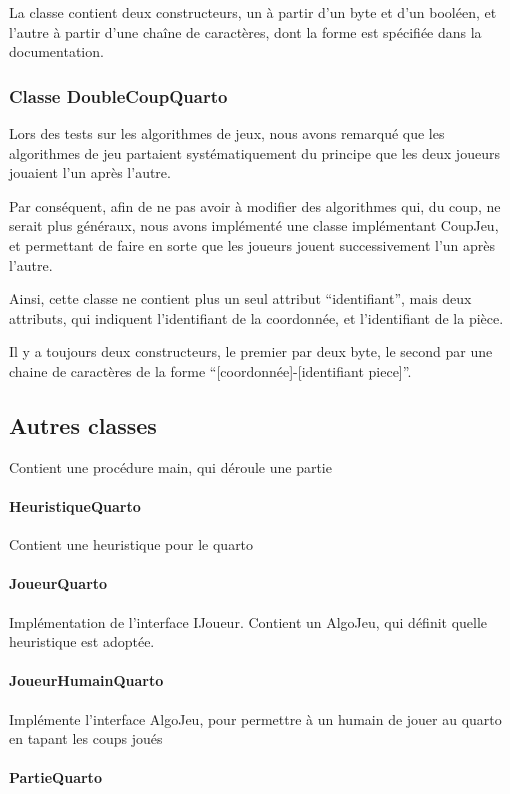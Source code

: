 \documentclass{article}
\begin{document}
La classe contient deux constructeurs, un à partir d'un byte et d'un
booléen, et l'autre à partir d'une chaîne de caractères, dont la forme
est spécifiée dans la documentation. %


\subsubsection{Classe DoubleCoupQuarto}
Lors des tests sur les algorithmes de jeux, nous avons remarqué que
les algorithmes de jeu partaient systématiquement du principe que les
deux joueurs jouaient l'un après l'autre.

Par conséquent, afin de ne pas avoir à modifier des algorithmes qui,
du coup, ne serait plus généraux, nous avons implémenté une classe
implémentant CoupJeu, et permettant de faire en sorte que les joueurs
jouent successivement l'un après l'autre.

Ainsi, cette classe ne contient plus un seul attribut ``identifiant'',
mais deux attributs, qui indiquent l'identifiant de la coordonnée,
et l'identifiant de la pièce.

Il y a toujours deux constructeurs, le premier par deux byte, le
second par une chaine de caractères de la forme
``[coordonnée]-[identifiant piece]''.

\subsection{Autres classes}
Contient une procédure main, qui déroule une partie

\paragraph{HeuristiqueQuarto}
Contient une heuristique pour le quarto

\paragraph{JoueurQuarto}
Implémentation de l'interface IJoueur. Contient un AlgoJeu, qui
définit quelle heuristique est adoptée.


\paragraph{JoueurHumainQuarto}
Implémente l'interface AlgoJeu, pour permettre à un humain de jouer au
quarto en tapant les coups joués

\paragraph{PartieQuarto}
\end{document}
